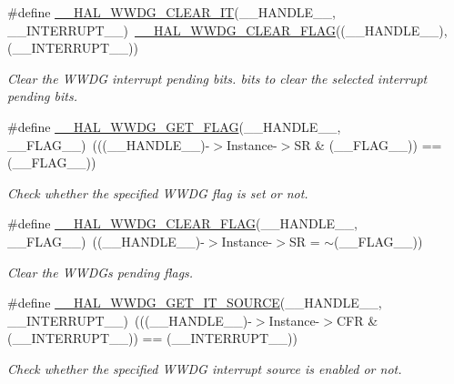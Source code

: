 \begin{DoxyCompactItemize}
\#define \hyperlink{group___w_w_d_g___exported___macros_ga8b36c9e3cea69d4463ca8483233bfef8}{\+\_\+\+\_\+\+H\+A\+L\+\_\+\+W\+W\+D\+G\+\_\+\+C\+L\+E\+A\+R\+\_\+\+IT}(\+\_\+\+\_\+\+H\+A\+N\+D\+L\+E\+\_\+\+\_\+,  \+\_\+\+\_\+\+I\+N\+T\+E\+R\+R\+U\+P\+T\+\_\+\+\_\+)~\hyperlink{group___w_w_d_g___exported___macros_gae9c3b916e244deffc6a673d97df63671}{\+\_\+\+\_\+\+H\+A\+L\+\_\+\+W\+W\+D\+G\+\_\+\+C\+L\+E\+A\+R\+\_\+\+F\+L\+AG}((\+\_\+\+\_\+\+H\+A\+N\+D\+L\+E\+\_\+\+\_\+), (\+\_\+\+\_\+\+I\+N\+T\+E\+R\+R\+U\+P\+T\+\_\+\+\_\+))
\begin{DoxyCompactList}\small\item\em Clear the W\+W\+DG interrupt pending bits. bits to clear the selected interrupt pending bits. \end{DoxyCompactList}\item 
\#define \hyperlink{group___w_w_d_g___exported___macros_ga60a99447a00a7d95c18637c38147063a}{\+\_\+\+\_\+\+H\+A\+L\+\_\+\+W\+W\+D\+G\+\_\+\+G\+E\+T\+\_\+\+F\+L\+AG}(\+\_\+\+\_\+\+H\+A\+N\+D\+L\+E\+\_\+\+\_\+,  \+\_\+\+\_\+\+F\+L\+A\+G\+\_\+\+\_\+)~(((\+\_\+\+\_\+\+H\+A\+N\+D\+L\+E\+\_\+\+\_\+)-\/$>$Instance-\/$>$SR \& (\+\_\+\+\_\+\+F\+L\+A\+G\+\_\+\+\_\+)) == (\+\_\+\+\_\+\+F\+L\+A\+G\+\_\+\+\_\+))
\begin{DoxyCompactList}\small\item\em Check whether the specified W\+W\+DG flag is set or not. \end{DoxyCompactList}\item 
\#define \hyperlink{group___w_w_d_g___exported___macros_gae9c3b916e244deffc6a673d97df63671}{\+\_\+\+\_\+\+H\+A\+L\+\_\+\+W\+W\+D\+G\+\_\+\+C\+L\+E\+A\+R\+\_\+\+F\+L\+AG}(\+\_\+\+\_\+\+H\+A\+N\+D\+L\+E\+\_\+\+\_\+,  \+\_\+\+\_\+\+F\+L\+A\+G\+\_\+\+\_\+)~((\+\_\+\+\_\+\+H\+A\+N\+D\+L\+E\+\_\+\+\_\+)-\/$>$Instance-\/$>$SR = $\sim$(\+\_\+\+\_\+\+F\+L\+A\+G\+\_\+\+\_\+))
\begin{DoxyCompactList}\small\item\em Clear the W\+W\+DG\textquotesingle{}s pending flags. \end{DoxyCompactList}\item 
\#define \hyperlink{group___w_w_d_g___exported___macros_gaa3dae290aeb528ba7dbd1e7f481ef139}{\+\_\+\+\_\+\+H\+A\+L\+\_\+\+W\+W\+D\+G\+\_\+\+G\+E\+T\+\_\+\+I\+T\+\_\+\+S\+O\+U\+R\+CE}(\+\_\+\+\_\+\+H\+A\+N\+D\+L\+E\+\_\+\+\_\+,  \+\_\+\+\_\+\+I\+N\+T\+E\+R\+R\+U\+P\+T\+\_\+\+\_\+)~(((\+\_\+\+\_\+\+H\+A\+N\+D\+L\+E\+\_\+\+\_\+)-\/$>$Instance-\/$>$C\+FR \& (\+\_\+\+\_\+\+I\+N\+T\+E\+R\+R\+U\+P\+T\+\_\+\+\_\+)) == (\+\_\+\+\_\+\+I\+N\+T\+E\+R\+R\+U\+P\+T\+\_\+\+\_\+))
\begin{DoxyCompactList}\small\item\em Check whether the specified W\+W\+DG interrupt source is enabled or not. \end{DoxyCompactList}\end{DoxyCompactItemize}


